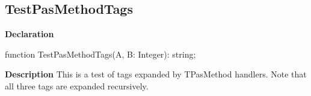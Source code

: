 \documentclass{report}
\begin{document}
\subsection*{TestPasMethodTags}
\begin{list}{}{
\setlength{\itemindent}{0cm}
\setlength{\listparindent}{0cm}
\setlength{\leftmargin}{\evensidemargin}
\addtolength{\leftmargin}{\tmplength}
\settowidth{\labelsep}{X}
\addtolength{\leftmargin}{\labelsep}
\setlength{\labelwidth}{\tmplength}
}
\begin{flushleft}
\item[\textbf{Declaration}\hfill]
\begin{ttfamily}
function TestPasMethodTags(A, B: Integer): string;\end{ttfamily}


\end{flushleft}
\par
\item[\textbf{Description}]
This is a test of tags expanded by TPasMethod handlers. Note that all three tags are expanded recursively.

 




\end{list}
\end{document}
